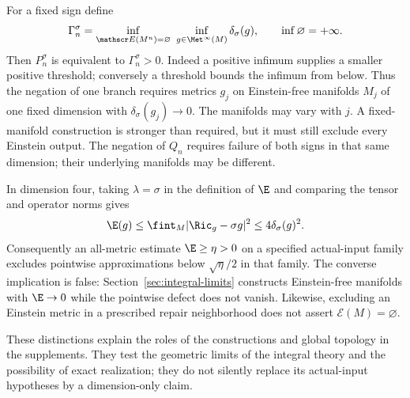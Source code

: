 For a fixed sign define
\[
 \Gamma_n^\sigma=
 \inf_{\mathscr E(M^n)=\varnothing}\ \inf_{g\in\Met^\infty(M)}
       \delta_\sigma(g),
 \qquad \inf\varnothing=+\infty.
\]
Then $P_n^\sigma$ is equivalent to $\Gamma_n^\sigma>0$.
Indeed a positive infimum supplies a smaller positive threshold;
conversely a threshold bounds the infimum from below. Thus the negation
of one branch requires metrics $g_j$ on Einstein-free manifolds $M_j$
of one fixed dimension with $\delta_\sigma(g_j)\to0$.
The manifolds may vary with $j$. A fixed-manifold construction is
stronger than required, but it must still exclude every Einstein output.
The negation of $Q_n$ requires failure of both signs in that same
dimension; their underlying manifolds may be different.

In dimension four, taking $\lambda=\sigma$ in the definition of
$\E$ and comparing the tensor and operator norms gives
\begin{equation}\label{eq:normalized-pointwise-integral}
 \E(g)\le\fint_M|\Ric_g-\sigma g|^2
          \le4\delta_\sigma(g)^2.
\end{equation}
Consequently an all-metric estimate $\E\ge\eta>0$ on a specified
actual-input family excludes pointwise approximations below
$\sqrt\eta/2$ in that family. The converse implication is false:
Section~\ref{sec:integral-limits} constructs Einstein-free manifolds
with $\E\to0$ while the pointwise defect does not vanish.
Likewise, excluding an Einstein metric in a prescribed repair
neighborhood does not assert $\mathscr E(M)=\varnothing$.

These distinctions explain the roles of the constructions and global
topology in the supplements. They test the geometric limits of the
integral theory and the possibility of exact realization; they do not
silently replace its actual-input hypotheses by a dimension-only claim.
